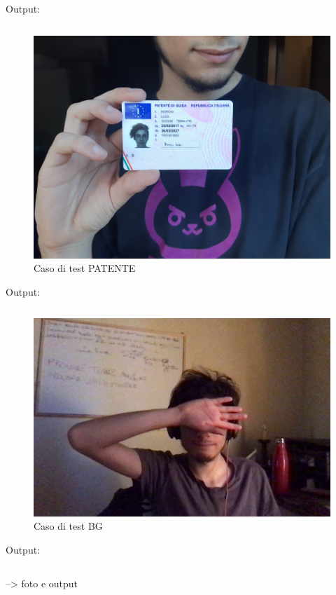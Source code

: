 \documentclass[12pt,a4paper]{article}
\begin{document}
Output:
\inputminted{json}{../test/test_tesserino.jpg}

\begin{figure}[H]
    \caption{Caso di test PATENTE}
    \centering
    \includegraphics[width=\textwidth,height=\textheight,keepaspectratio]{../test/test_patente.jpg}
\end{figure}

Output:
\inputminted{json}{../test/test_patente.json}

\begin{figure}[H]
    \caption{Caso di test BG}
    \centering
    \includegraphics[width=\textwidth,height=\textheight,keepaspectratio]{../test/test_background.jpg}
\end{figure}

Output:
\inputminted{json}{../test/test_background.json}
--> foto e output
\end{document}
